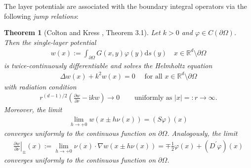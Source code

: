 \documentclass{article}
\theoremstyle{plain}
\newtheorem{thm}{Theorem}[section]
\theoremstyle{definition}
\begin{document}
The layer potentials are associated with the boundary integral operators via the following \textit{jump relations}:
\begin{thm}[Colton and Kress \cite{colton1998inverse}, Theorem 3.1]
    Let $k>0$ and $\varphi\in C(\partial\Omega)$. Then the single-layer potential
    \begin{align*}
        w(x) := \int_{\partial\Omega} G(x,y)\varphi(y)\mathrm ds(y) \quad x\in\mathbb R^d\setminus\partial\Omega
    \end{align*}
    is twice-continuously differentiable and solves the Helmholtz equation
    \begin{align*}
        \varDelta w(x) + k^2 w(x) = 0 \quad \text{ for all }x\in \mathbb R^d\setminus\partial\Omega
    \end{align*}
    with radiation condition
    \begin{align*}
        r^{(d-1)/2}\left( \frac{\partial w}{\partial r} - \mathrm ikw\right) \to 0  \quad &\text{ uniformly as } |x|=:r\to\infty.
    \end{align*}
    Moreover, the limit
    \begin{align*}
        \lim_{h\to +0} w(x \pm h\nu(x)) = (S\varphi)(x)
    \end{align*}
    converges uniformly to the continuous function on $\partial\Omega$. Analogously, the limit
    \begin{align*}
        \left.\frac{\partial w}{\partial\nu}\right|_\pm(x) :=  \lim_{h\to +0} \nu(x)\cdot \nabla w(x \pm h\nu(x)) = \mp \frac{1}{2}\varphi(x) + (D^\prime\varphi)(x)
    \end{align*}
    converges uniformly to the continuous function on $\partial\Omega$.
\end{thm}
\end{document}
